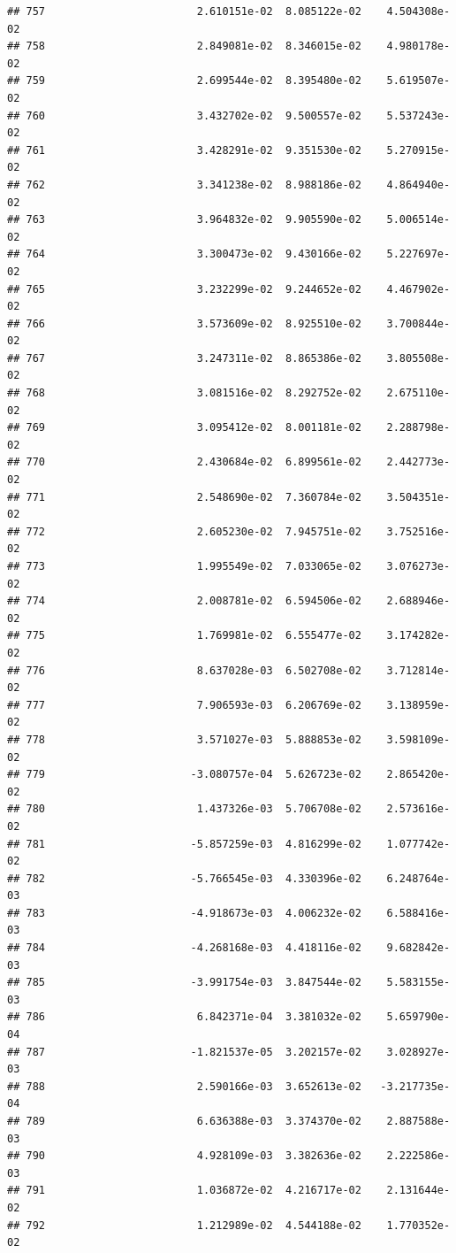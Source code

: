 \documentclass[
]{article}
\begin{document}
\begin{verbatim}
## 757                        2.610151e-02  8.085122e-02    4.504308e-02
## 758                        2.849081e-02  8.346015e-02    4.980178e-02
## 759                        2.699544e-02  8.395480e-02    5.619507e-02
## 760                        3.432702e-02  9.500557e-02    5.537243e-02
## 761                        3.428291e-02  9.351530e-02    5.270915e-02
## 762                        3.341238e-02  8.988186e-02    4.864940e-02
## 763                        3.964832e-02  9.905590e-02    5.006514e-02
## 764                        3.300473e-02  9.430166e-02    5.227697e-02
## 765                        3.232299e-02  9.244652e-02    4.467902e-02
## 766                        3.573609e-02  8.925510e-02    3.700844e-02
## 767                        3.247311e-02  8.865386e-02    3.805508e-02
## 768                        3.081516e-02  8.292752e-02    2.675110e-02
## 769                        3.095412e-02  8.001181e-02    2.288798e-02
## 770                        2.430684e-02  6.899561e-02    2.442773e-02
## 771                        2.548690e-02  7.360784e-02    3.504351e-02
## 772                        2.605230e-02  7.945751e-02    3.752516e-02
## 773                        1.995549e-02  7.033065e-02    3.076273e-02
## 774                        2.008781e-02  6.594506e-02    2.688946e-02
## 775                        1.769981e-02  6.555477e-02    3.174282e-02
## 776                        8.637028e-03  6.502708e-02    3.712814e-02
## 777                        7.906593e-03  6.206769e-02    3.138959e-02
## 778                        3.571027e-03  5.888853e-02    3.598109e-02
## 779                       -3.080757e-04  5.626723e-02    2.865420e-02
## 780                        1.437326e-03  5.706708e-02    2.573616e-02
## 781                       -5.857259e-03  4.816299e-02    1.077742e-02
## 782                       -5.766545e-03  4.330396e-02    6.248764e-03
## 783                       -4.918673e-03  4.006232e-02    6.588416e-03
## 784                       -4.268168e-03  4.418116e-02    9.682842e-03
## 785                       -3.991754e-03  3.847544e-02    5.583155e-03
## 786                        6.842371e-04  3.381032e-02    5.659790e-04
## 787                       -1.821537e-05  3.202157e-02    3.028927e-03
## 788                        2.590166e-03  3.652613e-02   -3.217735e-04
## 789                        6.636388e-03  3.374370e-02    2.887588e-03
## 790                        4.928109e-03  3.382636e-02    2.222586e-03
## 791                        1.036872e-02  4.216717e-02    2.131644e-02
## 792                        1.212989e-02  4.544188e-02    1.770352e-02

\end{verbatim}
\end{document}
